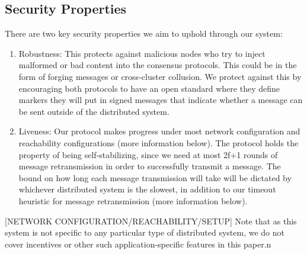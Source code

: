 \subsection{Security Properties}
There are two key security properties we aim to uphold through our system:
\begin{enumerate}
    \item Robustness: This protects against malicious nodes who try to inject malformed or bad content into the consensus protocols. This could be in the form of forging messages or cross-cluster collusion. We protect against this by encouraging both protocols to have an open standard where they define markers they will put in signed messages that indicate whether a message can be sent outside of the distributed system.
	\item Liveness: Our protocol makes progress under most network configuration and reachability configurations (more information below). The protocol holds the property of being self-stabilizing, since we need at most 2f+1 rounds of message retransmission in order to successfully transmit a message. The bound on how long each message transmission will take will be dictated by whichever distributed system is the slowest, in addition to our timeout heuristic for message retransmission (more information below). 
\end{enumerate}
[NETWORK CONFIGURATION/REACHABILITY/SETUP]
Note that as this system is not specific to any particular type of distributed system, we do not cover incentives or other such application-specific features in this paper.n
